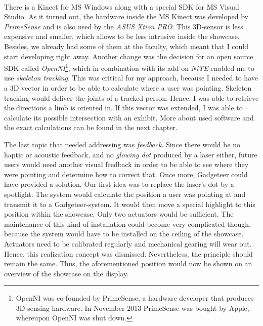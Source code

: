 \\
There is a Kinect for \ac{MS} Windows along with a special \ac{SDK} for \ac{MS} Visual Studio. As it turned out, the hardware inside the \ac{MS} Kinect was developed by \textit{PrimeSense} and is also used by the \textit{ASUS Xtion PRO}. This \ac{3D}-sensor is less expensive and smaller, which allows to be less intrusive inside the showcase. Besides, we already had some of them at the faculty, which meant that I could start developing right away. Another change was the decision for an open source \ac{SDK} called \textit{OpenNI}\footnote{OpenNI was co-founded by PrimeSense, a hardware developer that produces \ac{3D} sensing hardware. In November 2013 PrimeSense was bought by Apple, whereupon OpenNI was shut down.}, which in combination with its add-on \textit{NiTE} enabled me to use \textit{skeleton tracking}. This was critical for my approach, because I needed to have a \ac{3D} vector in order to be able to calculate where a user was pointing. Skeleton tracking would deliver the joints of a tracked person. Hence, I was able to retrieve the directions a limb is oriented in. If this vector was extended, I was able to calculate its possible intersection with an exhibit. More about used software and the exact calculations can be found in the next chapter.

The last topic that needed addressing was \textit{feedback}. Since there would be no haptic or acoustic feedback, and no \textit{glowing dot} produced by a laser either, future users would need another visual feedback in order to be able to see where they were pointing and determine how to correct that. Once more, Gadgeteer could have provided a solution. Our first idea was to replace the laser's dot by a spotlight. The system would calculate the position a user was pointing at and transmit it to a Gadgeteer-system. It would then move a special highlight to this position within the showcase. Only two actuators would be sufficient. The maintenance of this kind of installation could become very complicated though, because the system would have to be installed on the ceiling of the showcase. Actuators need to be calibrated regularly and mechanical gearing will wear out. Hence, this realization concept was dismissed. Nevertheless, the principle should remain the same. Thus, the aforementioned position would now be shown on an overview of the showcase on the display.

